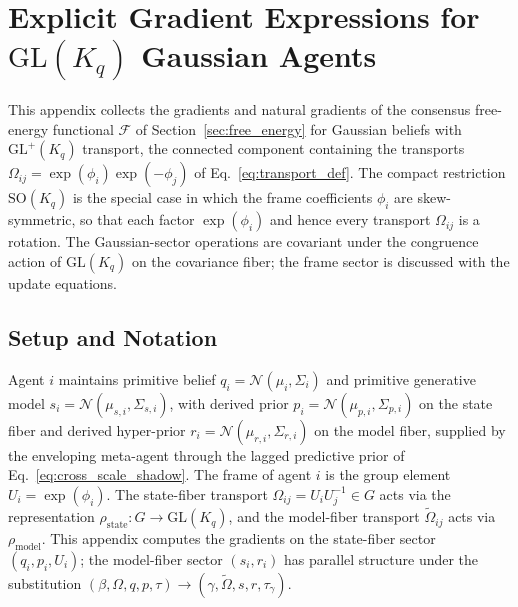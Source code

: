 \appendix

\section{\texorpdfstring{Explicit Gradient Expressions for $\mathrm{GL}(K_q)$ Gaussian Agents}{Explicit Gradient Expressions for GL(Kq) Gaussian Agents}}\label{app:gradients}

This appendix collects the gradients and natural gradients of the consensus free-energy functional $\mathcal{F}$ of Section~\ref{sec:free_energy} for Gaussian beliefs with $\mathrm{GL}^+(K_q)$ transport, the connected component containing the transports $\Omega_{ij} = \exp(\phi_i)\exp(-\phi_j)$ of Eq.~\eqref{eq:transport_def}. The compact restriction $\mathrm{SO}(K_q)$ is the special case in which the frame coefficients $\phi_i$ are skew-symmetric, so that each factor $\exp(\phi_i)$ and hence every transport $\Omega_{ij}$ is a rotation. The Gaussian-sector operations are covariant under the congruence action of $\mathrm{GL}(K_q)$ on the covariance fiber; the frame sector is discussed with the update equations.

\subsection*{Setup and Notation}

Agent $i$ maintains primitive belief $q_i = \mathcal{N}(\mu_i, \Sigma_i)$ and primitive generative model $s_i = \mathcal{N}(\mu_{s,i}, \Sigma_{s,i})$, with derived prior $p_i = \mathcal{N}(\mu_{p,i}, \Sigma_{p,i})$ on the state fiber and derived hyper-prior $r_i = \mathcal{N}(\mu_{r,i}, \Sigma_{r,i})$ on the model fiber, supplied by the enveloping meta-agent through the lagged predictive prior of Eq.~\eqref{eq:cross_scale_shadow}. The frame of agent $i$ is the group element $U_i = \exp(\phi_i)$. The state-fiber transport $\Omega_{ij} = U_iU_j^{-1} \in G$ acts via the representation $\rho_{\mathrm{state}}: G \to \mathrm{GL}(K_q)$, and the model-fiber transport $\tilde\Omega_{ij}$ acts via $\rho_{\mathrm{model}}$. This appendix computes the gradients on the state-fiber sector $(q_i, p_i, U_i)$; the model-fiber sector $(s_i, r_i)$ has parallel structure under the substitution $(\beta, \Omega, q, p, \tau) \to (\gamma, \tilde\Omega, s, r, \tau_\gamma)$.

